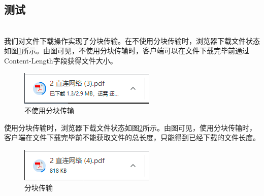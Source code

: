 \subsection{测试}
\ \\
我们对文件下载操作实现了分块传输。在不使用分块传输时，浏览器下载文件状态如图\ref{nochunk}所示。由图可见，不使用分块传输时，客户端可以在文件下载完毕前通过Content-Length字段获得文件大小。
\begin{figure}
\begin{center}
\includegraphics{figs/nochunk.PNG}
\end{center}
\caption{不使用分块传输}
\label{nochunk}
\end{figure}

使用分块传输时，浏览器下载文件状态如图\ref{chunk}所示。由图可见，使用分块传输时，客户端在文件下载完毕前不能获取文件的总长度，只能得到已经下载的文件长度。

\begin{figure}
\begin{center}
\includegraphics{figs/chunk.PNG}
\end{center}
\caption{分块传输}
\label{chunk}
\end{figure}